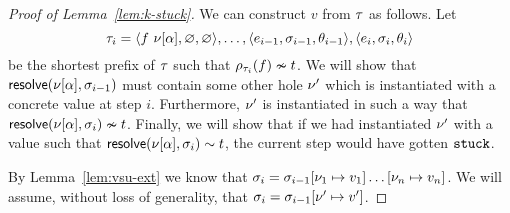 \begin{proof}[Proof of Lemma~\ref{lem:k-stuck}]
  We can construct $v$ from $\tau$ as follows.
  Let
  $$
  \tau_i = \langle f\ \nu[\alpha], \varnothing, \varnothing \rangle,
             \ldots,
             \langle e_{i-1}, \sigma_{i-1}, \theta_{i-1} \rangle,
             \langle e_{i}, \sigma_{i}, \theta_{i} \rangle
  $$
  be the shortest prefix of $\tau$ such that
  $\rho_{\tau_i}(f) \nsim t$.
  We will show that $\mathsf{resolve}(\nu[\alpha], \sigma_{i-1})$
  must contain some other hole $\nu'$ which is instantiated with a
  concrete value at step $i$.
  Furthermore, $\nu'$ is instantiated in such a way that
  $\mathsf{resolve}(\nu[\alpha], \sigma_{i}) \nsim t$.
  Finally, we will show that if we had instantiated $\nu'$ with a
  value such that
  $\mathsf{resolve}(\nu[\alpha], \sigma_{i}) \sim t$, the current
  step would have gotten $\mathtt{stuck}$.

  By Lemma~\ref{lem:vsu-ext} we know that
  $\sigma_{i} = \sigma_{i-1}[\nu_1 \mapsto v_1] \ldots [\nu_n \mapsto v_n]$.
  We will assume, without loss of generality, that
  $\sigma_{i} = \sigma_{i-1}[\nu' \mapsto v']$.


\end{proof}
